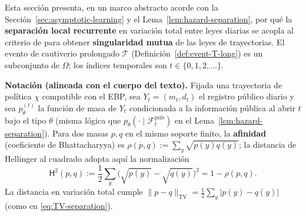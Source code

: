 \documentclass[12pt]{article}
\providecommand{\textcite}{\citet}
\theoremstyle{definition}
\theoremstyle{remark}
\newcommand{\1}{\mathbf{1}}
\begin{document}
Esta sección presenta, en un marco abstracto acorde con la Sección~\ref{sec:asymptotic-learning} y el Lema~\ref{lem:hazard-separation}, por qué la \textbf{separación local recurrente} en variación total entre leyes diarias se acopla al criterio de \textcite{Kakutani1948} para obtener \textbf{singularidad mutua} de las leyes de trayectorias. El evento de cautiverio prolongado $\mathcal{T}$ \textup{(}Definición~\ref{def:event-T-long}\textup{)} es un subconjunto de $\Omega$; los índices temporales son $t\in\{0,1,2,\ldots\}$.

\medskip\noindent\textbf{Notación \textup{(}alineada con el cuerpo del texto\textup{)}.}
Fijada una trayectoria de política $\chi$ compatible con el EBP, sea $Y_t=(m_t,d_t)$ el registro público diario y sea $p_\theta^{(t)}$ la función de masa de $Y_t$ condicionada a la información pública al abrir $t$ bajo el tipo $\theta$ \textup{(}misma lógica que $p_\theta(\cdot\mid\mathcal{F}_t^{\mathrm{pub}})$ en el Lema~\ref{lem:hazard-separation}\textup{)}. Para dos masas $p,q$ en el mismo soporte finito, la \textbf{afinidad} \textup{(}coeficiente de Bhattacharyya\textup{)} es $\rho(p,q):=\sum_y \sqrt{p(y)q(y)}$; la distancia de Hellinger al cuadrado adopta aquí la normalización
\[
\mathsf{H}^2(p,q):=\frac{1}{2}\sum_y\bigl(\sqrt{p(y)}-\sqrt{q(y)}\bigr)^2 = 1-\rho(p,q).
\]
La distancia en variación total cumple $\|p-q\|_{\mathrm{TV}}=\tfrac{1}{2}\sum_y|p(y)-q(y)|$ \textup{(}como en \eqref{eq:TV-separation}\textup{)}.
\end{document}
